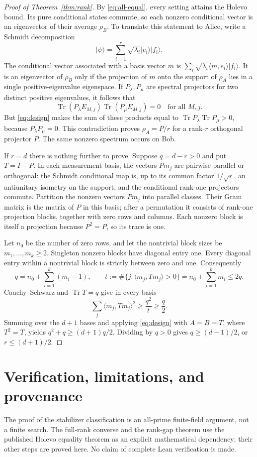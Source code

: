 \documentclass[11pt]{article}
\theoremstyle{remark}\newtheorem{remark}[theorem]{Remark}
\newcommand{\ket}[1]{\lvert#1\rangle}
\DeclareMathOperator{\Tr}{Tr}
\begin{document}
\begin{proof}[Proof of Theorem~\ref{thm:rank}]
By \eqref{eq:all-equal}, every setting attains the Holevo bound. Its pure conditional states commute, so each nonzero conditional vector is an eigenvector of their average $\rho_B$.
To translate this statement to Alice, write a Schmidt decomposition
\[
 \ket\psi=\sum_{i=1}^r\sqrt{\lambda_i}\ket{e_i}\ket{f_i}.
\]
The conditional vector associated with a basis vector $m$ is
$\sum_i\sqrt{\lambda_i}\langle m,e_i\rangle\ket{f_i}$.
It is an eigenvector of $\rho_B$ only if the projection of $m$ onto the support of $\rho_A$ lies in a single positive-eigenvalue eigenspace. If $P_\lambda,P_\mu$ are spectral projectors for two distinct positive eigenvalues, it follows that
\[
 \Tr(P_\lambda E_{M,j})\Tr(P_\mu E_{M,j})=0
 \quad\text{for all }M,j.
\]
But \eqref{eq:design} makes the sum of these products equal to
$\Tr P_\lambda\Tr P_\mu>0$, because $P_\lambda P_\mu=0$. This contradiction proves $\rho_A=P/r$ for a rank-$r$ orthogonal projector $P$. The same nonzero spectrum occurs on Bob.

If $r=d$ there is nothing further to prove. Suppose $q=d-r>0$ and put $T=I-P$. In each measurement basis, the vectors $P m_j$ are pairwise parallel or orthogonal: the Schmidt conditional map is, up to its common factor $1/\sqrt r$, an antiunitary isometry on the support, and the conditional rank-one projectors commute. Partition the nonzero vectors $P m_j$ into parallel classes. Their Gram matrix is the matrix of $P$ in this basis; after a permutation it consists of rank-one projection blocks, together with zero rows and columns. Each nonzero block is itself a projection because $P^2=P$, so its trace is one.

Let $n_0$ be the number of zero rows, and let the nontrivial block sizes be $m_1,\ldots,m_k\ge2$. Singleton nonzero blocks have diagonal entry one. Every diagonal entry within a nontrivial block is strictly between zero and one. Consequently
\[
 q=n_0+\sum_{i=1}^k(m_i-1),\qquad
 t:=\#\{j:\langle m_j,Tm_j\rangle>0\}
 =n_0+\sum_{i=1}^km_i\le2q.
\]
Cauchy--Schwarz and $\Tr T=q$ give in every basis
\[
 \sum_j\langle m_j,Tm_j\rangle^2\ge\frac{q^2}{t}\ge\frac q2.
\]
Summing over the $d+1$ bases and applying \eqref{eq:design} with $A=B=T$, where $T^2=T$, yields
$q^2+q\ge(d+1)q/2$. Dividing by $q>0$ gives $q\ge(d-1)/2$, or $r\le(d+1)/2$.
\end{proof}

\section{Verification, limitations, and provenance}
The proof of the stabilizer classification is an all-prime finite-field argument, not a finite search. The full-rank converse and the rank-gap theorem use the published Holevo equality theorem as an explicit mathematical dependency; their other steps are proved here. No claim of complete Lean verification is made.
\end{document}
